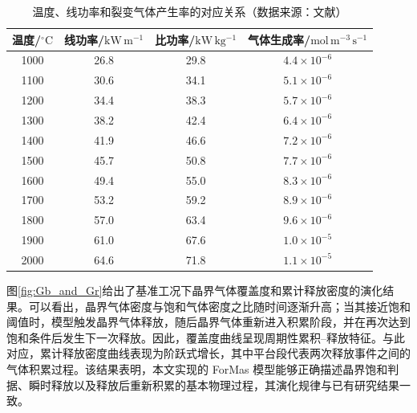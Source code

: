 \begin{table}[htbp]
	\centering
	\caption{温度、线功率和裂变气体产生率的对应关系（数据来源：文献\cite{forsbergDiffusionTheoryFission1985}）}
	\label{tab:ForMas_condition}

	\begin{tabular*}{\textwidth}{@{\extracolsep{\fill}}cccc@{}}
		\toprule

		温度/${}^\circ\mathrm{C}$ &
		线功率/$\mathrm{kW\,m^{-1}}$ &
		比功率/$\mathrm{kW\,kg^{-1}}$ &
		气体生成率/$\mathrm{mol\,m^{-3}\,s^{-1}}$ \\

		\midrule

		1000 & 26.8 & 29.8 & \(4.4 \times 10^{-6}\) \\
		1100 & 30.6 & 34.1 & \(5.1 \times 10^{-6}\) \\
		1200 & 34.4 & 38.3 & \(5.7 \times 10^{-6}\) \\
		1300 & 38.2 & 42.4 & \(6.4 \times 10^{-6}\) \\
		1400 & 41.9 & 46.6 & \(7.2 \times 10^{-6}\) \\
		1500 & 45.7 & 50.8 & \(7.7 \times 10^{-6}\) \\
		1600 & 49.4 & 55.0 & \(8.3 \times 10^{-6}\) \\
		1700 & 53.2 & 59.2 & \(8.9 \times 10^{-6}\) \\
		1800 & 57.0 & 63.4 & \(9.6 \times 10^{-6}\) \\
		1900 & 61.0 & 67.6 & \(1.0 \times 10^{-5}\) \\
		2000 & 64.6 & 71.8 & \(1.1 \times 10^{-5}\) \\

		\bottomrule
	\end{tabular*}
\end{table}

图\ref{fig:Gb_and_Gr}给出了基准工况下晶界气体覆盖度和累计释放密度的演化结果。可以看出，晶界气体密度与饱和气体密度之比随时间逐渐升高；当其接近饱和阈值时，模型触发晶界气体释放，随后晶界气体重新进入积累阶段，并在再次达到饱和条件后发生下一次释放。因此，覆盖度曲线呈现周期性累积--释放特征。与此对应，累计释放密度曲线表现为阶跃式增长，其中平台段代表两次释放事件之间的气体积累过程。该结果表明，本文实现的 ForMas 模型能够正确描述晶界饱和判据、瞬时释放以及释放后重新积累的基本物理过程，其演化规律与已有研究结果一致\cite{ZhangXiaoDiHeRanLiaoXinKuaiLieBianQiTiShiFangXingWeiMoNiYanJiu2016}。

